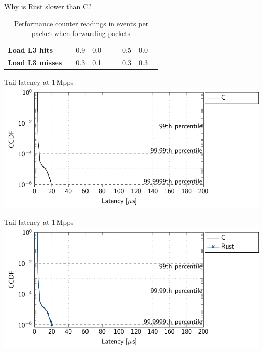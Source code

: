 \documentclass[NET,english,aspectratio=169,notitleframe]{tumbeamer}
\begin{document}
\begin{frame}{Why is Rust slower than C?}
\begin{table}[t]
\begin{tabular}{lrrrrrrrr}
\color{TUMLightGray}		\textbf{Load L3 hits}                     & &\color{TUMLightGray} 0.9 &\color{TUMLightGray} 0.0      &&& \color{TUMLightGray}0.5 & \color{TUMLightGray}0.0 \\
\color{TUMLightGray}		\textbf{Load L3 misses}               & & \color{TUMLightGray}0.3 &\color{TUMLightGray} 0.1         &&& \color{TUMLightGray}0.3 & \color{TUMLightGray}0.3 \\
		\bottomrule
	\end{tabular}
	\caption{Performance counter readings in events per packet when forwarding packets}
	\label{tbl:rust-profiling}
	\vspace{-3em}
\end{table}
\end{frame}





\begin{frame}{Tail latency at 1\,Mpps}
\hspace{1.7cm}\includegraphics[scale=1]{figures/latency-1/latency-ccdf-1.pdf}
\end{frame}
\addtocounter{framenumber}{-1}

\begin{frame}{Tail latency at 1\,Mpps}
\hspace{1.7cm}\includegraphics[scale=1]{figures/latency-1/latency-ccdf-2.pdf}
\end{frame}
\addtocounter{framenumber}{-1}
\end{document}
